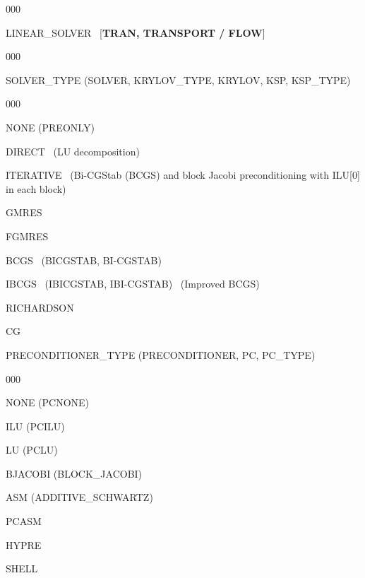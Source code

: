 \begin{deflist}{000}
\item[LINEAR\_SOLVER] \ [{\bf TRAN, TRANSPORT / FLOW}]

\begin{deflist}{000}
\item[SOLVER\_TYPE (SOLVER, KRYLOV\_TYPE, KRYLOV, KSP, KSP\_TYPE)] ~

\begin{deflist}{000}
\item[NONE (PREONLY)]
\item[DIRECT] \ (LU decomposition)
\item[ITERATIVE] \ (Bi-CGStab (BCGS) and block Jacobi preconditioning with ILU[0] in each block)
\item[GMRES]
\item[FGMRES]
\item[BCGS] \ (BICGSTAB, BI-CGSTAB) 
\item[IBCGS] \ (IBICGSTAB, IBI-CGSTAB) \ (Improved BCGS)
\item[RICHARDSON]
\item[CG]
\end{deflist}

\item[PRECONDITIONER\_TYPE (PRECONDITIONER, PC, PC\_TYPE)] ~

\begin{deflist}{000}
\item[NONE (PCNONE)]
\item[ILU (PCILU)] 
\item[LU (PCLU)]
\item[BJACOBI (BLOCK\_JACOBI)]
\item[ASM (ADDITIVE\_SCHWARTZ)]
\item[PCASM]
\item[HYPRE]
\item[SHELL]
\end{deflist}


\end{deflist}
\end{deflist}
